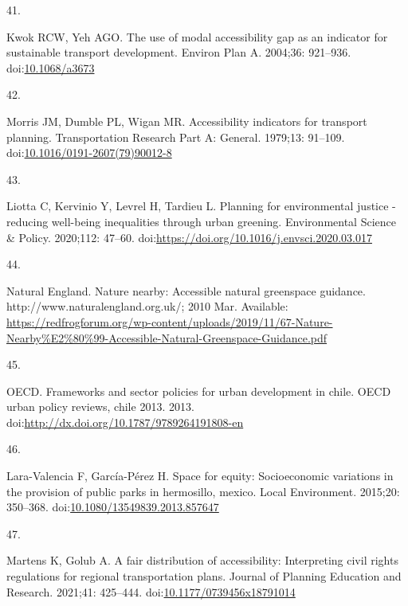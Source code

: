 \documentclass[10pt,letterpaper]{article}
\newlength{\cslhangindent}
\newlength{\csllabelwidth}
\newlength{\cslentryspacingunit} %
\newenvironment{CSLReferences}[2] %
 {%
  \setlength{\parindent}{0pt}
  \ifodd #1
  \let\oldpar\par
  \def\par{\hangindent=\cslhangindent\oldpar}
  \fi
  \setlength{\parskip}{#2\cslentryspacingunit}
 }%
 {}
\newcommand{\CSLLeftMargin}[1]{\parbox[t]{\csllabelwidth}{#1}}
\newcommand{\CSLRightInline}[1]{\parbox[t]{\linewidth - \csllabelwidth}{#1}\break}
\begin{document}
\begin{CSLReferences}{0}{0}
\leavevmode{}%
\CSLLeftMargin{41. }%
\CSLRightInline{Kwok RCW, Yeh AGO. The use of modal accessibility gap as
an indicator for sustainable transport development. Environ Plan A.
2004;36: 921--936.
doi:\href{https://doi.org/10.1068/a3673}{10.1068/a3673}}

\leavevmode{}%
\CSLLeftMargin{42. }%
\CSLRightInline{Morris JM, Dumble PL, Wigan MR. Accessibility indicators
for transport planning. Transportation Research Part A: General.
1979;13: 91--109.
doi:\href{https://doi.org/10.1016/0191-2607(79)90012-8}{10.1016/0191-2607(79)90012-8}}

\leavevmode{}%
\CSLLeftMargin{43. }%
\CSLRightInline{Liotta C, Kervinio Y, Levrel H, Tardieu L. Planning for
environmental justice - reducing well-being inequalities through urban
greening. Environmental Science \& Policy. 2020;112: 47--60.
doi:\url{https://doi.org/10.1016/j.envsci.2020.03.017}}

\leavevmode{}%
\CSLLeftMargin{44. }%
\CSLRightInline{Natural England. Nature nearby: Accessible natural
greenspace guidance. http://www.naturalengland.org.uk/; 2010 Mar.
Available:
\url{https://redfrogforum.org/wp-content/uploads/2019/11/67-Nature-Nearby\%E2\%80\%99-Accessible-Natural-Greenspace-Guidance.pdf}}

\leavevmode{}%
\CSLLeftMargin{45. }%
\CSLRightInline{OECD. Frameworks and sector policies for urban
development in chile. OECD urban policy reviews, chile 2013. 2013.
doi:\url{http://dx.doi.org/10.1787/9789264191808-en}}

\leavevmode{}%
\CSLLeftMargin{46. }%
\CSLRightInline{Lara-Valencia F, García-Pérez H. Space for equity:
Socioeconomic variations in the provision of public parks in hermosillo,
mexico. Local Environment. 2015;20: 350--368.
doi:\href{https://doi.org/10.1080/13549839.2013.857647}{10.1080/13549839.2013.857647}}

\leavevmode{}%
\CSLLeftMargin{47. }%
\CSLRightInline{Martens K, Golub A. A fair distribution of
accessibility: Interpreting civil rights regulations for regional
transportation plans. Journal of Planning Education and Research.
2021;41: 425--444.
doi:\href{https://doi.org/10.1177/0739456x18791014}{10.1177/0739456x18791014}}


\end{CSLReferences}
\end{document}
